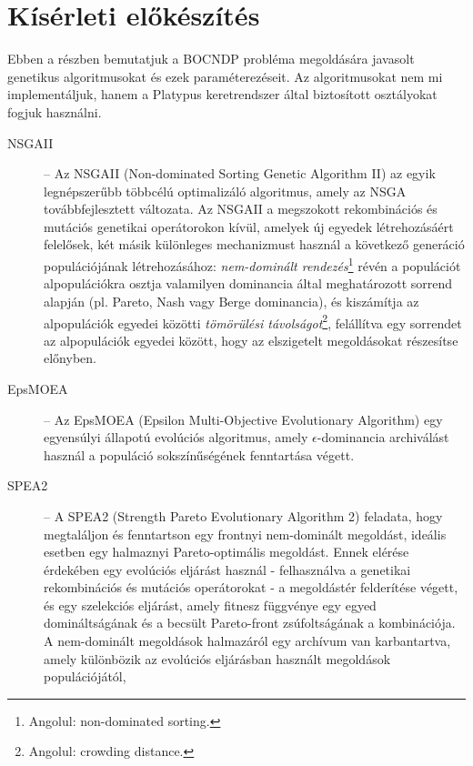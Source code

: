 \section{Kísérleti előkészítés}\label{sec:KISERLETI_ELOKESZITES}

Ebben a részben bemutatjuk a BOCNDP probléma megoldására javasolt genetikus algoritmusokat és ezek paraméterezéseit.
Az algoritmusokat nem mi implementáljuk, hanem a Platypus keretrendszer \cite{hadka2017platypus} által biztosított osztályokat fogjuk használni.

\begin{description}
      \item[NSGAII] -- Az NSGAII (Non-dominated Sorting Genetic Algorithm II) \cite{deb2002fast} az egyik legnépszerűbb többcélú optimalizáló algoritmus,
            amely az NSGA továbbfejlesztett változata. Az NSGAII a megszokott rekombinációs és mutációs genetikai operátorokon kívül,
            amelyek új egyedek létrehozásáért felelősek, két másik különleges mechanizmust használ a következő generáció populációjának létrehozásához:
            \textit{nem-dominált rendezés}\footnote{ Angolul: non-dominated sorting. } révén a populációt alpopulációkra
            osztja valamilyen dominancia által meghatározott sorrend alapján (pl. Pareto, Nash vagy Berge dominancia),
            és kiszámítja az alpopulációk egyedei közötti \textit{tömörülési távolságot}\footnote{ Angolul: crowding distance. },
            felállítva egy sorrendet az alpopulációk egyedei között, hogy az elszigetelt megoldásokat részesítse előnyben.
      \item[EpsMOEA] -- Az EpsMOEA (Epsilon Multi-Objective Evolutionary Algorithm) \cite{deb2003towards} egy egyensúlyi állapotú evolúciós algoritmus,
            amely $\epsilon$-dominancia archiválást használ a populáció sokszínűségének fenntartása végett.
      \item[SPEA2] -- A SPEA2 (Strength Pareto Evolutionary Algorithm 2) \cite{zitzler2001spea2} feladata, hogy megtaláljon és fenntartson egy frontnyi nem-dominált megoldást,
            ideális esetben egy halmaznyi Pareto-optimális megoldást. Ennek elérése érdekében egy evolúciós eljárást használ
            - felhasználva a genetikai rekombinációs és mutációs operátorokat - a megoldástér felderítése végett,
            és egy szelekciós eljárást, amely fitnesz függvénye egy egyed domináltságának és a becsült Pareto-front zsúfoltságának a kombinációja.
            A nem-dominált megoldások halmazáról egy archívum van karbantartva, amely különbözik az evolúciós eljárásban használt megoldások populációjától,

\end{description}
